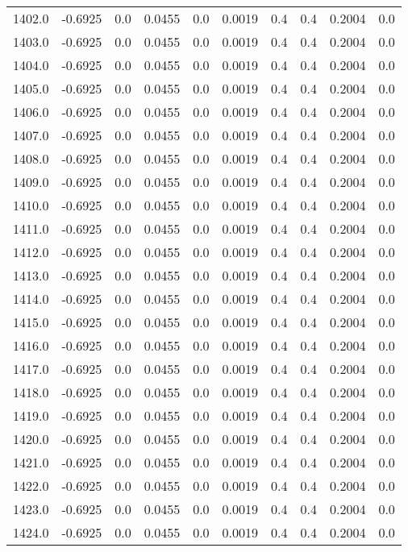 \begin{longtable}{lrrrrrrrrr}
1402.0 & -0.6925 & 0.0 & 0.0455 & 0.0 & 0.0019 & 0.4 & 0.4 & 0.2004 & 0.0 \\
1403.0 & -0.6925 & 0.0 & 0.0455 & 0.0 & 0.0019 & 0.4 & 0.4 & 0.2004 & 0.0 \\
1404.0 & -0.6925 & 0.0 & 0.0455 & 0.0 & 0.0019 & 0.4 & 0.4 & 0.2004 & 0.0 \\
1405.0 & -0.6925 & 0.0 & 0.0455 & 0.0 & 0.0019 & 0.4 & 0.4 & 0.2004 & 0.0 \\
1406.0 & -0.6925 & 0.0 & 0.0455 & 0.0 & 0.0019 & 0.4 & 0.4 & 0.2004 & 0.0 \\
1407.0 & -0.6925 & 0.0 & 0.0455 & 0.0 & 0.0019 & 0.4 & 0.4 & 0.2004 & 0.0 \\
1408.0 & -0.6925 & 0.0 & 0.0455 & 0.0 & 0.0019 & 0.4 & 0.4 & 0.2004 & 0.0 \\
1409.0 & -0.6925 & 0.0 & 0.0455 & 0.0 & 0.0019 & 0.4 & 0.4 & 0.2004 & 0.0 \\
1410.0 & -0.6925 & 0.0 & 0.0455 & 0.0 & 0.0019 & 0.4 & 0.4 & 0.2004 & 0.0 \\
1411.0 & -0.6925 & 0.0 & 0.0455 & 0.0 & 0.0019 & 0.4 & 0.4 & 0.2004 & 0.0 \\
1412.0 & -0.6925 & 0.0 & 0.0455 & 0.0 & 0.0019 & 0.4 & 0.4 & 0.2004 & 0.0 \\
1413.0 & -0.6925 & 0.0 & 0.0455 & 0.0 & 0.0019 & 0.4 & 0.4 & 0.2004 & 0.0 \\
1414.0 & -0.6925 & 0.0 & 0.0455 & 0.0 & 0.0019 & 0.4 & 0.4 & 0.2004 & 0.0 \\
1415.0 & -0.6925 & 0.0 & 0.0455 & 0.0 & 0.0019 & 0.4 & 0.4 & 0.2004 & 0.0 \\
1416.0 & -0.6925 & 0.0 & 0.0455 & 0.0 & 0.0019 & 0.4 & 0.4 & 0.2004 & 0.0 \\
1417.0 & -0.6925 & 0.0 & 0.0455 & 0.0 & 0.0019 & 0.4 & 0.4 & 0.2004 & 0.0 \\
1418.0 & -0.6925 & 0.0 & 0.0455 & 0.0 & 0.0019 & 0.4 & 0.4 & 0.2004 & 0.0 \\
1419.0 & -0.6925 & 0.0 & 0.0455 & 0.0 & 0.0019 & 0.4 & 0.4 & 0.2004 & 0.0 \\
1420.0 & -0.6925 & 0.0 & 0.0455 & 0.0 & 0.0019 & 0.4 & 0.4 & 0.2004 & 0.0 \\
1421.0 & -0.6925 & 0.0 & 0.0455 & 0.0 & 0.0019 & 0.4 & 0.4 & 0.2004 & 0.0 \\
1422.0 & -0.6925 & 0.0 & 0.0455 & 0.0 & 0.0019 & 0.4 & 0.4 & 0.2004 & 0.0 \\
1423.0 & -0.6925 & 0.0 & 0.0455 & 0.0 & 0.0019 & 0.4 & 0.4 & 0.2004 & 0.0 \\
1424.0 & -0.6925 & 0.0 & 0.0455 & 0.0 & 0.0019 & 0.4 & 0.4 & 0.2004 & 0.0 \\

\end{longtable}
